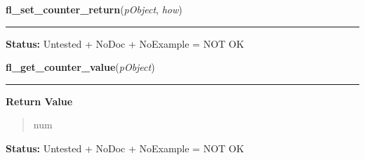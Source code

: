     \vspace{0.5ex}

\hspace{.8\funcindent}\begin{boxedminipage}{\funcwidth}

    \raggedright \textbf{fl\_set\_counter\_return}(\textit{pObject}, \textit{how})

    \vspace{-1.5ex}

    \rule{\textwidth}{0.5\fboxrule}
\setlength{\parskip}{2ex}
\setlength{\parskip}{1ex}
\textbf{Status:} Untested + NoDoc + NoExample = NOT OK



    \end{boxedminipage}

    \label{xformslib:library:fl_get_counter_value}

    \vspace{0.5ex}

\hspace{.8\funcindent}\begin{boxedminipage}{\funcwidth}

    \raggedright \textbf{fl\_get\_counter\_value}(\textit{pObject})

    \vspace{-1.5ex}

    \rule{\textwidth}{0.5\fboxrule}
\setlength{\parskip}{2ex}
\setlength{\parskip}{1ex}
      \textbf{Return Value}
    \vspace{-1ex}

      \begin{quote}
      num

      \end{quote}

\textbf{Status:} Untested + NoDoc + NoExample = NOT OK



    \end{boxedminipage}

    \label{xformslib:library:fl_get_counter_bounds}

    \vspace{0.5ex}

